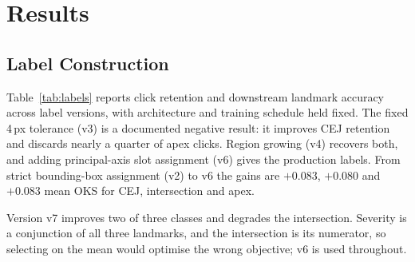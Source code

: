 \documentclass[conference]{IEEEtran}
\begin{document}
\section{Results}
\label{sec:results}

\subsection{Label Construction}

Table~\ref{tab:labels} reports click retention and downstream landmark accuracy across label versions, with architecture and training schedule held fixed. The fixed 4\,px tolerance (v3) is a documented negative result: it improves CEJ retention and discards nearly a quarter of apex clicks. Region growing (v4) recovers both, and adding principal-axis slot assignment (v6) gives the production labels. From strict bounding-box assignment (v2) to v6 the gains are $+0.083$, $+0.080$ and $+0.083$ mean OKS for CEJ, intersection and apex.

\begin{table}[t]
\caption{Label construction: click retention and resulting landmark accuracy (mean OKS, test split).}
\label{tab:labels}
\centering
{}
\end{table}

Version v7 improves two of three classes and degrades the intersection. Severity is a conjunction of all three landmarks, and the intersection is its numerator, so selecting on the mean would optimise the wrong objective; v6 is used throughout.
\end{document}
